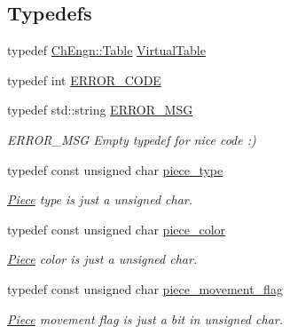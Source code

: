\subsection*{Typedefs}
\begin{DoxyCompactItemize}
\item 
typedef \hyperlink{classChEngn_1_1Table}{ChEngn::Table} \hyperlink{namespaceChEngn_a5ba229504d25ed1b2086f1df62f6db41}{VirtualTable}
\item 
typedef int \hyperlink{namespaceChEngn_a347ab4e4a29f725ed0253d8311c82233}{ERROR\_\-CODE}
\item 
\hypertarget{namespaceChEngn_a01b85c98a5b00144710f14c2e5c11656}{
typedef std::string \hyperlink{namespaceChEngn_a01b85c98a5b00144710f14c2e5c11656}{ERROR\_\-MSG}}
\label{namespaceChEngn_a01b85c98a5b00144710f14c2e5c11656}

\begin{DoxyCompactList}\small\item\em ERROR\_\-MSG Empty typedef for nice code :) \item\end{DoxyCompactList}\item 
\hypertarget{namespaceChEngn_a2a35c185f259757a78e937575b8ed483}{
typedef const unsigned char \hyperlink{namespaceChEngn_a2a35c185f259757a78e937575b8ed483}{piece\_\-type}}
\label{namespaceChEngn_a2a35c185f259757a78e937575b8ed483}

\begin{DoxyCompactList}\small\item\em \hyperlink{classChEngn_1_1Piece}{Piece} type is just a unsigned char. \item\end{DoxyCompactList}\item 
\hypertarget{namespaceChEngn_a9c81426c0134a97288a226c122daf62f}{
typedef const unsigned char \hyperlink{namespaceChEngn_a9c81426c0134a97288a226c122daf62f}{piece\_\-color}}
\label{namespaceChEngn_a9c81426c0134a97288a226c122daf62f}

\begin{DoxyCompactList}\small\item\em \hyperlink{classChEngn_1_1Piece}{Piece} color is just a unsigned char. \item\end{DoxyCompactList}\item 
\hypertarget{namespaceChEngn_a491b2eba2f766087f4f28948005ab16a}{
typedef const unsigned char \hyperlink{namespaceChEngn_a491b2eba2f766087f4f28948005ab16a}{piece\_\-movement\_\-flag}}
\label{namespaceChEngn_a491b2eba2f766087f4f28948005ab16a}

\begin{DoxyCompactList}\small\item\em \hyperlink{classChEngn_1_1Piece}{Piece} movement flag is just a bit in unsigned char. \item\end{DoxyCompactList}\end{DoxyCompactItemize}
